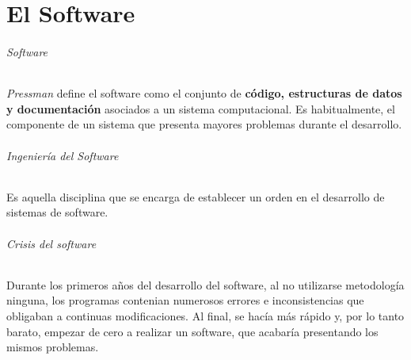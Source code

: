\part{El Software}

\paragraph{Software}
\textit{Pressman} define el software como el conjunto de \textbf{código, estructuras de datos y documentación} asociados a un sistema computacional. Es habitualmente, el componente de un sistema que presenta mayores problemas durante el desarrollo.

\paragraph{Ingeniería del Software}
Es aquella disciplina que se encarga de establecer un orden en el desarrollo de sistemas de software.

\paragraph{Crisis del software}
Durante los primeros años del desarrollo del software, al no utilizarse metodología ninguna, los programas contenian numerosos errores e inconsistencias que obligaban a continuas modificaciones. Al final, se hacía más rápido y, por lo tanto barato, empezar de cero a realizar un software, que acabaría presentando los mismos problemas.

